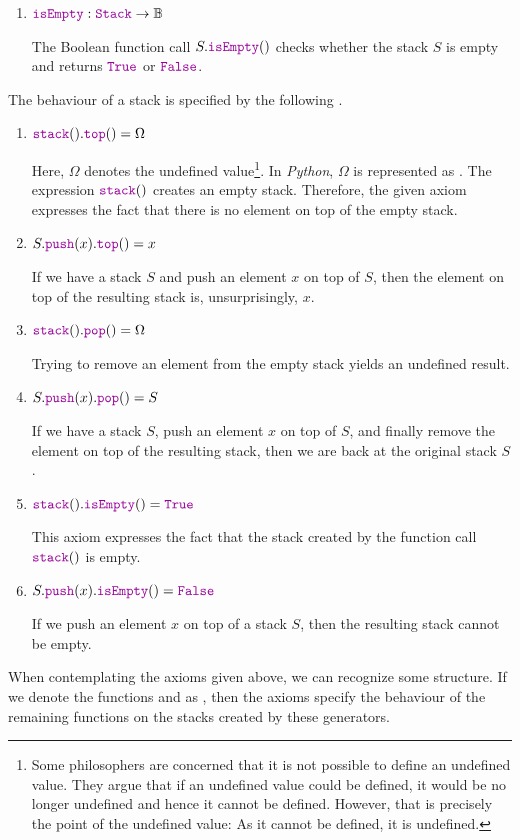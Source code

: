\begin{enumerate}
\begin{enumerate}
            The function call $S.\mytt{top}()$ returns the element that is on top of the stack $S$. 
            The stack $S$ is left unchanged.  If $S$ is empty, then the result is undefined.
     \item $\mytt{isEmpty}: \mytt{Stack} \rightarrow \mathbb{B}$

           The Boolean function call $S.\mytt{isEmpty}()$ checks whether the stack $S$ is empty
           and returns $\mytt{True}$ or $\mytt{False}$.
      \end{enumerate}
\end{enumerate}
The behaviour of a stack is specified by the following .
\begin{enumerate}
\item $\mytt{stack}().\mytt{top}() = \Omega$

      Here, $\Omega$ \index{$\Omega$} denotes the undefined value\footnote{
       Some philosophers are concerned that it is not possible to define an undefined value.
       They argue that if an undefined value could be defined, it would be no longer undefined
       and hence it cannot be defined.  However, that is precisely the point of the undefined 
       value: As it cannot be defined, it is undefined. }.
        
      In \textsl{Python}, $\Omega$ is represented as . The expression $\mytt{stack}()$
      creates an empty stack.  Therefore, the given axiom expresses the fact that there is no
      element on top of the empty stack.
\item $S.\mytt{push}(x).\mytt{top}() = x$

      If we have a stack $S$ and push an element $x$ on top of $S$, then the element on top
      of the resulting stack is, unsurprisingly, $x$.
\item $\mytt{stack}().\mytt{pop}() = \Omega$

      Trying to remove an element from the empty stack yields an undefined result.
\item $S.\mytt{push}(x).\mytt{pop}() = S$

      If we have a stack $S$, push an element $x$ on top of $S$, and finally remove the element
      on top of the resulting stack, then we are back at the original stack $S$.
    
\item $\mytt{stack}().\mytt{isEmpty}() = \mytt{True}$

      This axiom expresses the fact that the stack created by the function call $\mytt{stack}()$
      is empty.
\item $S.\mytt{push}(x).\mytt{isEmpty}() = \mytt{False}$

      If we push an element $x$ on top of a stack $S$, then the resulting stack cannot be empty.
\end{enumerate}
When contemplating the axioms given above, we can recognize some structure.  If we denote the
functions  and  as ,  then the axioms specify the
behaviour of the remaining functions on the stacks created by these generators.

